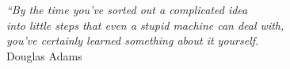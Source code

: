 \cleardoublepage
\thispagestyle{plain}

\vspace*{8cm}

\begin{flushright}
   \textsl{``By the time you've sorted out a complicated idea
   \\into little steps that even a stupid machine can deal with,
    \\you’ve certainly learned something about it yourself.}\\
\vspace*{1.5cm}
           Douglas Adams
\end{flushright}
